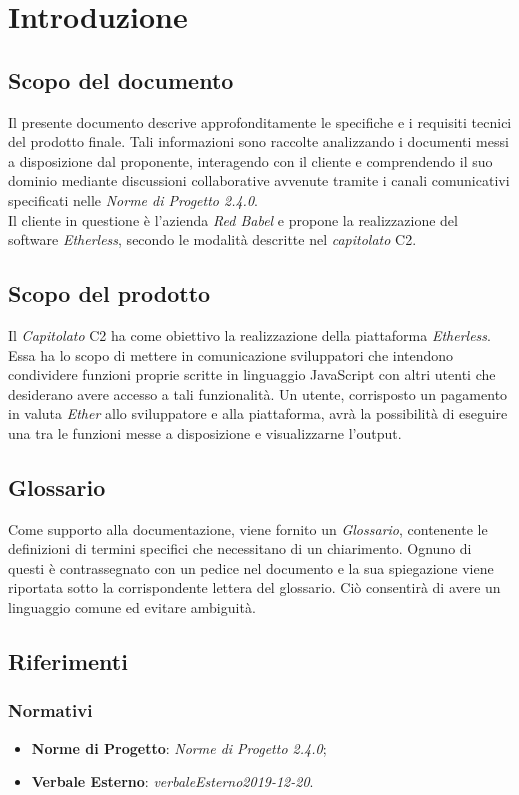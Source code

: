 \section{Introduzione}

\subsection{Scopo del documento}
Il presente documento descrive approfonditamente le specifiche e i requisiti tecnici del prodotto finale. Tali informazioni sono raccolte analizzando i documenti messi a disposizione dal proponente, interagendo con il cliente e comprendendo il suo dominio mediante discussioni collaborative avvenute tramite i canali comunicativi specificati nelle \textit{Norme di Progetto 2.4.0}\docs.\\
Il cliente in questione è l'azienda \textit{Red Babel} e propone la realizzazione del software \textit{Etherless}, secondo le modalità descritte nel \textit{capitolato\glo} C2.

\subsection{Scopo del prodotto}
Il \textit{Capitolato\glo} C2 ha come obiettivo la realizzazione della piattaforma \textit{Etherless}. Essa ha lo scopo di mettere in comunicazione sviluppatori che intendono condividere funzioni proprie scritte in linguaggio JavaScript con altri utenti che desiderano avere accesso a tali funzionalità. Un utente, corrisposto un pagamento in valuta \textit{Ether\glo} allo sviluppatore e alla piattaforma, avrà la possibilità di eseguire una tra le funzioni messe a disposizione e visualizzarne l'output.

\subsection{Glossario}
Come supporto alla documentazione, viene fornito un \textit{Glossario}\docs,
contenente le definizioni di termini specifici che necessitano di un chiarimento.
Ognuno di questi è contrassegnato con un pedice \glo nel documento e la sua
spiegazione viene riportata sotto la corrispondente lettera del glossario. Ciò
consentir\`a di avere un linguaggio comune ed evitare ambiguità.
	
\subsection{Riferimenti}
\subsubsection{Normativi}
	\begin{itemize}
		\item \textbf{Norme di Progetto}: \textit{Norme di Progetto 2.4.0\docs};
		\item \textbf{Verbale Esterno}: \textit{verbaleEsterno2019-12-20\docs}.
	\end{itemize}
